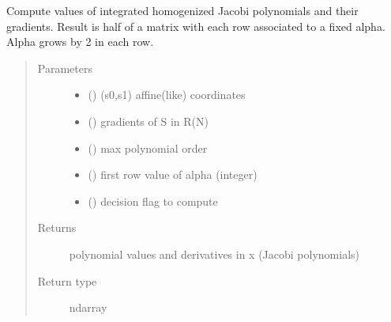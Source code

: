 \documentclass[letterpaper,10pt,english]{sphinxmanual}
\begin{document}
\begin{fulllineitems}
\label{\detokenize{petgem/hvfem:petgem.hvfem.HomIJacobi}}
Compute values of integrated homogenized Jacobi polynomials and their gradients.
Result is half of a  matrix with each row  associated to a fixed alpha.
Alpha grows by 2 in each row.
\begin{quote}\begin{description}
\item[{Parameters}] \leavevmode\begin{itemize}
\item {} 
 () \textendash{} (s0,s1) affine(like) coordinates

\item {} 
 () \textendash{} gradients of S in R(N)

\item {} 
 () \textendash{} max polynomial order

\item {} 
 () \textendash{} first row value of alpha (integer)

\item {} 
 () \textendash{} decision flag to compute

\end{itemize}

\item[{Returns}] \leavevmode
polynomial values and derivatives in x (Jacobi polynomials)

\item[{Return type}] \leavevmode
ndarray

\end{description}\end{quote}

\end{fulllineitems}

\end{document}
